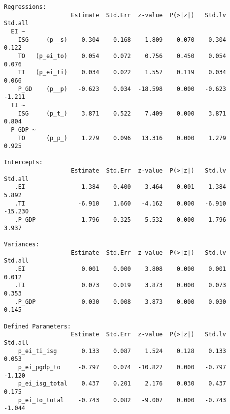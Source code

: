 \begin{verbatim}
Regressions:
                   Estimate  Std.Err  z-value  P(>|z|)   Std.lv  Std.all
  EI ~                                                                  
    ISG     (p__s)    0.304    0.168    1.809    0.070    0.304    0.122
    TO   (p_ei_to)    0.054    0.072    0.756    0.450    0.054    0.076
    TI   (p_ei_ti)    0.034    0.022    1.557    0.119    0.034    0.066
    P_GD    (p__p)   -0.623    0.034  -18.598    0.000   -0.623   -1.211
  TI ~                                                                  
    ISG     (p_t_)    3.871    0.522    7.409    0.000    3.871    0.804
  P_GDP ~                                                               
    TO      (p_p_)    1.279    0.096   13.316    0.000    1.279    0.925

Intercepts:
                   Estimate  Std.Err  z-value  P(>|z|)   Std.lv  Std.all
   .EI                1.384    0.400    3.464    0.001    1.384    5.892
   .TI               -6.910    1.660   -4.162    0.000   -6.910  -15.230
   .P_GDP             1.796    0.325    5.532    0.000    1.796    3.937

Variances:
                   Estimate  Std.Err  z-value  P(>|z|)   Std.lv  Std.all
   .EI                0.001    0.000    3.808    0.000    0.001    0.012
   .TI                0.073    0.019    3.873    0.000    0.073    0.353
   .P_GDP             0.030    0.008    3.873    0.000    0.030    0.145

Defined Parameters:
                   Estimate  Std.Err  z-value  P(>|z|)   Std.lv  Std.all
    p_ei_ti_isg       0.133    0.087    1.524    0.128    0.133    0.053
    p_ei_pgdp_to     -0.797    0.074  -10.827    0.000   -0.797   -1.120
    p_ei_isg_total    0.437    0.201    2.176    0.030    0.437    0.175
    p_ei_to_total    -0.743    0.082   -9.007    0.000   -0.743   -1.044

\end{verbatim}
